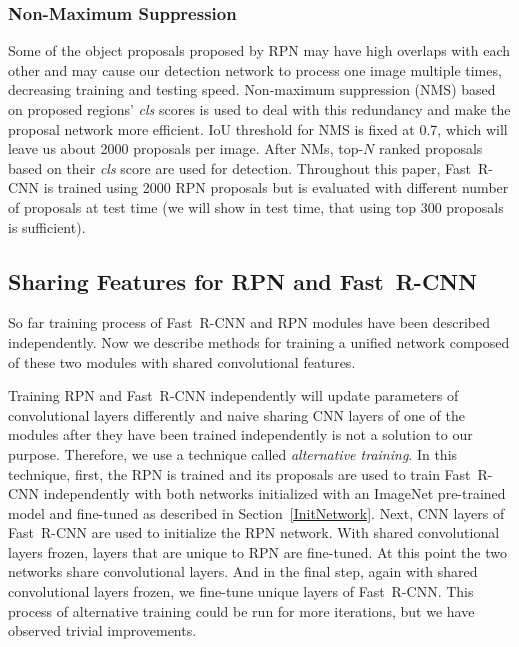 \documentclass[conference]{IEEEtran}
\newcommand{\fast}[0]{\mbox{Fast~R-CNN}}
\begin{document}
\subsubsection{Non-Maximum Suppression}
Some of the object proposals proposed by RPN may have high overlaps with each other and may cause our detection network to process one image multiple times, decreasing training and testing speed. Non-maximum suppression (NMS) based on proposed regions' \textit{cls} scores is used to deal with this redundancy and make the proposal network more efficient. IoU threshold for NMS is fixed at 0.7, which will leave us about 2000 proposals per image. After NMs, top-$N$ ranked proposals based on their \textit{cls} score are used for detection. Throughout this paper, \fast{} is trained using 2000 RPN proposals but is evaluated with different number of proposals at test time (we will show in test time, that using top 300 proposals is sufficient).


\subsection{Sharing Features for RPN and \fast{}}
So far training process of \fast{} and RPN modules have been described independently. Now we describe methods for training a unified network composed of these two modules with shared convolutional features.

Training RPN and \fast{} independently will update parameters of convolutional layers differently and naive sharing CNN layers of one of the modules after they have been trained independently is not a solution to our purpose. Therefore, we use a technique called \textit{alternative training}. In this technique, first, the RPN is trained and its proposals are used to train \fast{} independently with both networks initialized with an ImageNet pre-trained model and fine-tuned as described in Section~\ref{InitNetwork}. Next, CNN layers of \fast{} are used to initialize the RPN network. With shared convolutional layers frozen, layers that are unique to RPN are fine-tuned. At this point the two networks share convolutional layers. And in the final step, again with shared convolutional layers frozen, we fine-tune unique layers of \fast{}. This process of alternative training could be run for more iterations, but we have observed trivial improvements.
\end{document}
